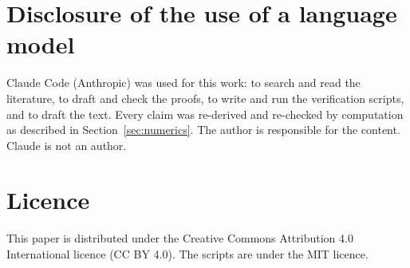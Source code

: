 \documentclass[11pt]{amsart}
\theoremstyle{remark}
\begin{document}
\section*{Disclosure of the use of a language model}
Claude Code (Anthropic) was used for this work: to search and read the literature, to draft and check the proofs, to write and run the verification scripts, and to draft the text. Every claim was re-derived and re-checked by computation as described in Section~\ref{sec:numerics}. The author is responsible for the content. Claude is not an author.

\section*{Licence}
This paper is distributed under the Creative Commons Attribution 4.0 International licence (CC BY 4.0). The scripts are under the MIT licence.
\end{document}
